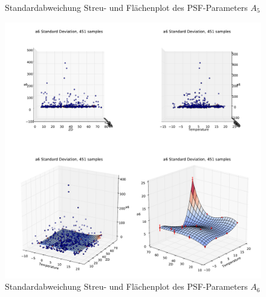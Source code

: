 \begin{appendix}
\begin{figure}[H]
	\caption[Standardabweichung Streu- und Flächenplot des PSF-Parameters $A_5$]{Standardabweichung Streu- und Flächenplot des PSF-Parameters $A_5$}
    \label{psf_surf_a5_std}
\end{figure}
\begin{figure}[H]
	\centering
	\includegraphics[scale=.48]{psf_surf/a6_std.pdf}
	\caption[Standardabweichung Streu- und Flächenplot des PSF-Parameters $A_6$]{Standardabweichung Streu- und Flächenplot des PSF-Parameters $A_6$}
    \label{psf_surf_a6_std}
\end{figure}


\end{appendix}
